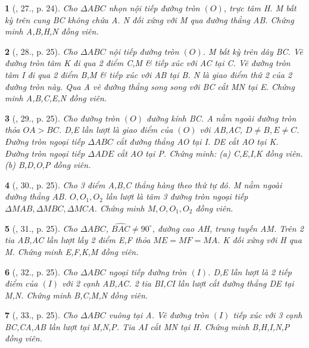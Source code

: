 \documentclass{article}
\newtheorem{baitoan}{}
\begin{document}
\begin{baitoan}[\cite{Thu_Chung_Viet_Minh_circ}, 27., p. 24]
	Cho $\Delta ABC$ nhọn nội tiếp đường tròn $(O)$, trực tâm H. M bất kỳ trên cung BC không chứa A. N đối xứng với M qua đường thẳng AB. Chứng minh A,B,H,N đồng viên.
\end{baitoan}

\begin{baitoan}[\cite{Thu_Chung_Viet_Minh_circ}, 28., p. 25]
	Cho $\Delta ABC$ nội tiếp đường tròn $(O)$. M bất kỳ trên dây BC. Vẽ đường tròn tâm K đi qua 2 điểm C,M \& tiếp xúc với AC tại C. Vẽ đường tròn tâm I đi qua 2 điểm B,M \& tiếp xúc với AB tại B. N là giao điểm thứ 2 của 2 đường tròn này. Qua A vẽ đường thẳng song song với BC cắt MN tại E. Chứng minh A,B,C,E,N đồng viên.
\end{baitoan}

\begin{baitoan}[\cite{Thu_Chung_Viet_Minh_circ}, 29., p. 25]
	Cho đường tròn $(O)$ đường kính BC. A nằm ngoài đường tròn thỏa $OA > BC$. D,E lần lượt là giao điểm của $(O)$ với AB,AC, $D\ne B,E\ne C$. Đường tròn ngoại tiếp $\Delta ABC$ cắt đường thẳng AO tại I. DE cắt AO tại K. Đường tròn ngoại tiếp $\Delta ADE$ cắt AO tại P. Chứng minh: (a) C,E,I,K đồng viên. (b) B,D,O,P đồng viên.
\end{baitoan}

\begin{baitoan}[\cite{Thu_Chung_Viet_Minh_circ}, 30., p. 25]
	Cho 3 điểm A,B,C thẳng hàng theo thứ tự đó. M nằm ngoài đường thẳng AB. $O,O_1,O_2$ lần lượt là tâm 3 đường tròn ngoại tiếp $\Delta MAB,\Delta MBC,\Delta MCA$. Chứng minh $M,O,O_1,O_2$ đồng viên.
\end{baitoan}

\begin{baitoan}[\cite{Thu_Chung_Viet_Minh_circ}, 31., p. 25]
	Cho $\Delta ABC$, $\widehat{BAC}\ne90^\circ$, đường cao AH, trung tuyến AM. Trên 2 tia AB,AC lần lượt lấy 2 điểm E,F thỏa $ME = MF = MA$. K đối xứng với H qua M. Chứng minh E,F,K,M đồng viên.
\end{baitoan}

\begin{baitoan}[\cite{Thu_Chung_Viet_Minh_circ}, 32., p. 25]
	Cho $\Delta ABC$ ngoại tiếp đường tròn $(I)$. D,E lần lượt là 2 tiếp điểm của $(I)$ với 2 cạnh AB,AC. 2 tia BI,CI lần lượt cắt đường thẳng DE tại M,N. Chứng minh B,C,M,N đồng viên.
\end{baitoan}

\begin{baitoan}[\cite{Thu_Chung_Viet_Minh_circ}, 33., p. 25]
	Cho $\Delta ABC$ vuông tại A. Vẽ đường tròn $(I)$ tiếp xúc với 3 cạnh BC,CA,AB lần lượt tại M,N,P. Tia AI cắt MN tại H. Chứng minh B,H,I,N,P đồng viên.
\end{baitoan}
\end{document}
